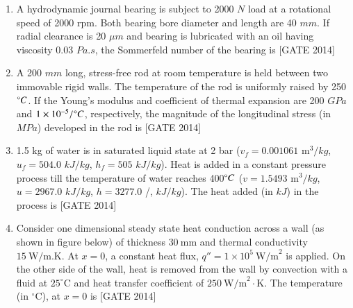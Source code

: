\documentclass[journal,12pt,onecolumn]{IEEEtran}
\theoremstyle{remark}
\begin{document}
\begin{enumerate}
\begin{centering}
\end{centering}    
   
\hfill{[GATE 2014]}
    \begin{multicols}{4}
    \begin{enumerate}
        \item $\sqrt{\frac{k}{2m}}$
        \item $\sqrt{\frac{k}{m}}$
        \item $\sqrt{\frac{2k}{m}}$
        \item $\sqrt{\frac{5k}{m}}$
    \end{enumerate}
    \end{multicols}
    \item A hydrodynamic journal bearing is subject to 2000 $N$ load at a rotational speed of 2000 rpm. Both bearing bore diameter and length are 40 $mm$. If radial clearance is 20 $\mu m$ and bearing is lubricated with an oil having viscosity 0.03 $Pa.s$, the Sommerfeld number of the bearing is \underline{\hspace{2cm}}\hfill{[GATE 2014]}
   \\
    

    \item A 200 $mm$ long, stress-free rod at room temperature is held between two immovable rigid walls. The temperature of the rod is uniformly raised by 250$\degree C$. If the Young's modulus and coefficient of thermal expansion are 200 $GPa$ and $1 \times 10^{-5}/ \degree C$, respectively, the magnitude of the longitudinal stress (in $MPa$) developed in the rod is \underline{\hspace{2cm}}\hfill{[GATE 2014]}
  \\
  
\item 1.5 kg of water is in saturated liquid state at 2 bar ($v_f = 0.001061$ m$^3 /kg$, $u_f = 504.0$ $kJ/kg$, $h_f = 505$ $kJ/kg$). Heat is added in a constant pressure process till the temperature of water reaches 400$\degree C$ ($v = 1.5493$ m$^3 /kg$, $u = 2967.0$ $kJ/kg$, $h = 3277.0$ /, $kJ/kg$). The heat added (in $kJ$) in the process is \underline{\hspace{2cm}}\hfill{[GATE 2014]}
 \\
    
 \item Consider one dimensional steady state heat conduction across a wall (as shown in figure below) of thickness $30 \ \text{mm}$ and thermal conductivity $15 \ \text{W/m.K}$. At $x = 0$, a constant heat flux, $q'' = 1 \times 10^5 \ \text{W/m}^2$ is applied. On the other side of the wall, heat is removed from the wall by convection with a fluid at $25^\circ \text{C}$ and heat transfer coefficient of $250 \ \text{W/m}^2\cdot\text{K}$. The temperature (in $^\circ \text{C}$), at $x = 0$ is \underline{\hspace{2cm}}\hfill{[GATE 2014]}

\begin{center}
  
    \end{center}

 
\end{enumerate}
\end{document}
